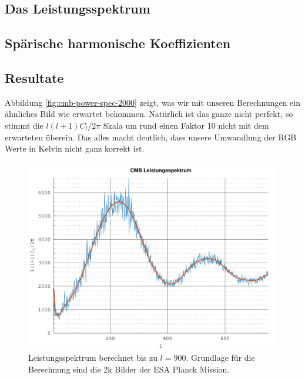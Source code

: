 \subsection{Das Leistungsspektrum}


\subsection{Spärische harmonische Koeffizienten}

\subsection{Resultate}

Abbildung \ref{fig:cmb-power-spec-2000} zeigt, was wir mit unseren Berechnungen 
ein ähnliches Bild wie erwartet bekommen. Natürlich ist das ganze nicht 
perfekt, so stimmt die $l(l+1)C_l/2\pi$ Skala um rund einen Faktor 10 nicht mit 
dem erwarteten überein. Das alles macht deutlich, dass unsere Umwandlung der 
RGB Werte in Kelvin nicht ganz korrekt ist.

\begin{figure}
	\centering
	\includegraphics[width=\linewidth]{cmb/data/2k900-500.pdf}
	\caption{Leistungsspektrum berechnet bis zu $l = 900$. Grundlage für die 
		Berechnung sind die 2k Bilder der ESA Planck Mission.}
	\label{fig:cmb-power-spec-900}
\end{figure}

